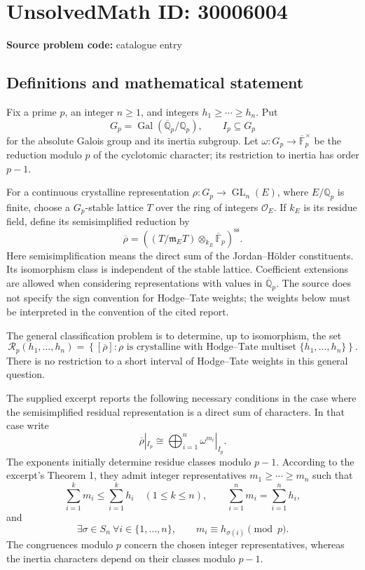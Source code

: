 \documentclass[11pt]{article}
\newcommand{\Q}{\mathbb{Q}}
\newcommand{\F}{\mathbb{F}}
\begin{document}
\section*{UnsolvedMath ID: 30006004}
\textbf{Source problem code:} catalogue entry
\subsection{Definitions and mathematical statement}
Fix a prime \(p\), an integer \(n\geq 1\), and integers \(h_1\geq\cdots\geq h_n\). Put
\[
G_p=\operatorname{Gal}(\overline{\Q}_p/\Q_p),\qquad I_p\subseteq G_p
\]
for the absolute Galois group and its inertia subgroup. Let \(\omega:G_p\to\overline{\F}_p^{\times}\) be the reduction modulo \(p\) of the cyclotomic character; its restriction to inertia has order \(p-1\).

For a continuous crystalline representation \(\rho:G_p\to\operatorname{GL}_n(E)\), where \(E/\Q_p\) is finite, choose a \(G_p\)-stable lattice \(T\) over the ring of integers \(\mathcal O_E\). If \(k_E\) is its residue field, define its semisimplified reduction by
\[
\overline\rho=\left((T/\mathfrak m_E T)\otimes_{k_E}\overline{\F}_p\right)^{\mathrm{ss}}.
\]
Here semisimplification means the direct sum of the Jordan--H\"older constituents. Its isomorphism class is independent of the stable lattice. Coefficient extensions are allowed when considering representations with values in \(\overline{\Q}_p\). The source does not specify the sign convention for Hodge--Tate weights; the weights below must be interpreted in the convention of the cited report.

The general classification problem is to determine, up to isomorphism, the set
\[
\mathcal R_p(h_1,\ldots,h_n)=
\left\{[\overline\rho]:\rho\text{ is crystalline with Hodge--Tate multiset }\{h_1,\ldots,h_n\}\right\}.
\]
There is no restriction to a short interval of Hodge--Tate weights in this general question.

The supplied excerpt reports the following necessary conditions in the case where the semisimplified residual representation is a direct sum of characters. In that case write
\[
\overline\rho|_{I_p}\cong\bigoplus_{i=1}^n\omega^{m_i}|_{I_p}.
\]
The exponents initially determine residue classes modulo \(p-1\). According to the excerpt's Theorem 1, they admit integer representatives \(m_1\geq\cdots\geq m_n\) such that
\[
\sum_{i=1}^k m_i\leq\sum_{i=1}^k h_i\quad(1\leq k\leq n),\qquad
\sum_{i=1}^n m_i=\sum_{i=1}^n h_i,
\]
and
\[
\exists\sigma\in S_n\ \forall i\in\{1,\ldots,n\},\qquad
m_i\equiv h_{\sigma(i)}\pmod p.
\]
The congruences modulo \(p\) concern the chosen integer representatives, whereas the inertia characters depend on their classes modulo \(p-1\).
\end{document}
